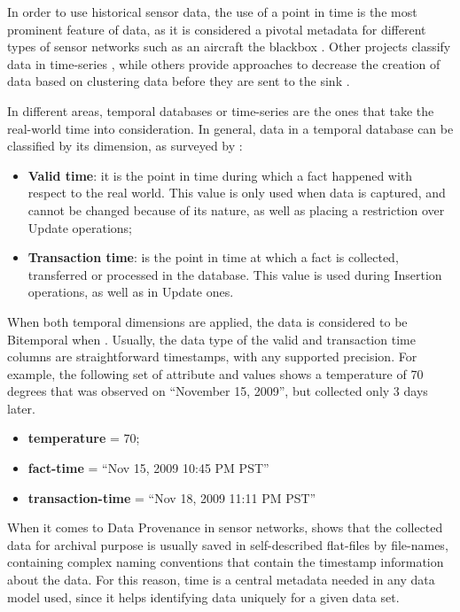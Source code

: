 In order to use historical sensor data, the use of a point in time is the most
prominent feature of data, as it is considered a pivotal metadata for different
types of sensor networks such as an aircraft the blackbox
\cite{sn-exemple-blackbox}. Other projects classify data in time-series
\cite{sn-time-series-example}, while others provide approaches to decrease
the creation of data based on clustering data before they are sent to the sink
\cite{sn-time-series}.

In different areas, temporal databases or time-series are the ones that take
the real-world time into consideration. In general, data in a temporal database
can be classified by its dimension, as surveyed by \cite{db-temporal}:

\begin{itemize}
  \item \textbf{Valid time}: it is the point in time during which a fact
  happened with respect to the real world. This value is only used when data is
  captured, and cannot be changed because of its nature, as well as placing a
  restriction over Update operations;
  \item \textbf{Transaction time}: is the point in time at which a fact is
  collected, transferred or processed in the database. This value is used
  during Insertion operations, as well as in Update ones.
\end{itemize}

When both temporal dimensions are applied, the data is considered to be
Bitemporal when \cite{db-temporal}. Usually, the data type of the valid and
transaction time columns are straightforward timestamps, with any supported
precision. For example, the following set of attribute and values shows a
temperature of 70 degrees that was observed on ``November 15, 2009'', but
collected only 3 days later.

\begin{itemize}
  \item \textbf{temperature} = 70;
  \item \textbf{fact-time} = ``Nov 15, 2009 10:45 PM PST''
  \item \textbf{transaction-time} = ``Nov 18, 2009 11:11 PM PST''
\end{itemize}

When it comes to Data Provenance in sensor networks, \cite{sn-provenance}
shows that the collected data for archival purpose is usually saved in 
self-described flat-files by file-names, containing complex naming conventions
that contain the timestamp information about the data. For this reason, time
is a central metadata needed in any data model used, since it helps
identifying data uniquely for a given data set.

